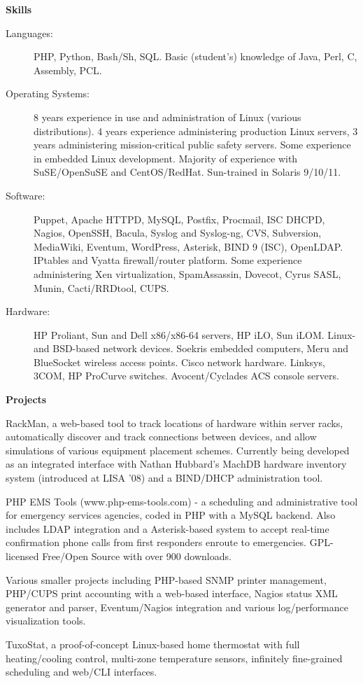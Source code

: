 \documentclass[letterpaper,11pt]{article}
\newcommand{\resheading}[1]{{\large \colorbox{mygrey}{\begin{minipage}{\textwidth}{\textbf{#1 \vphantom{p\^{E}}}}\end{minipage}}}}
\begin{document}
\resheading{Skills}

\begin{description}
\item[Languages:]
PHP, Python, Bash/Sh, SQL. Basic (student's) knowledge of Java, Perl, C,
Assembly, PCL.
\item[Operating Systems:]
8 years experience in use and administration of Linux (various
distributions). 4 years experience administering production Linux servers, 3
years administering mission-critical public safety servers. Some experience in
embedded Linux development. Majority of experience with SuSE/OpenSuSE and
CentOS/RedHat.
Sun-trained in Solaris 9/10/11.
\item[Software:]
Puppet, Apache HTTPD, MySQL, Postfix, Procmail, ISC DHCPD, Nagios, OpenSSH,
Bacula,
Syslog and Syslog-ng, CVS, Subversion, MediaWiki, Eventum, WordPress,
Asterisk, BIND 9 (ISC), OpenLDAP. IPtables and Vyatta firewall/router
platform. Some experience administering Xen virtualization, SpamAssassin,
Dovecot, Cyrus SASL, Munin, Cacti/RRDtool,  CUPS.

\item[Hardware:]
HP Proliant, Sun and Dell x86/x86-64 servers, HP iLO, Sun iLOM. Linux- and
BSD-based network devices. Soekris embedded computers, Meru and BlueSocket
wireless access points. Cisco network hardware. Linksys, 3COM, HP ProCurve
switches. Avocent/Cyclades ACS console servers.
\end{description}

\pagebreak

\resheading{Projects}

\begin{description}
\item[In Progress] RackMan, a web-based tool to track locations of hardware
  within server racks, automatically discover and track connections between
  devices, and allow simulations of various equipment placement
  schemes. Currently being developed as an integrated interface with Nathan
  Hubbard's MachDB hardware inventory system (introduced at LISA '08) and a
  BIND/DHCP administration tool.
\item[2007--Present] PHP EMS Tools (www.php-ems-tools.com) - a scheduling and
  administrative tool for emergency services agencies, coded in PHP with a MySQL
  backend. Also includes LDAP integration and a Asterisk-based system to accept
  real-time confirmation phone calls from first responders enroute to
  emergencies. GPL-licensed Free/Open Source with over 900 downloads.
\item Various smaller projects including PHP-based SNMP printer management,
  PHP/CUPS print accounting with a web-based interface, Nagios status XML
  generator and parser, Eventum/Nagios integration and various log/performance
  visualization tools.
\item TuxoStat, a proof-of-concept Linux-based home thermostat with full
  heating/cooling control, multi-zone temperature sensors, infinitely
  fine-grained scheduling and web/CLI interfaces.
\end{description}
\end{document}
